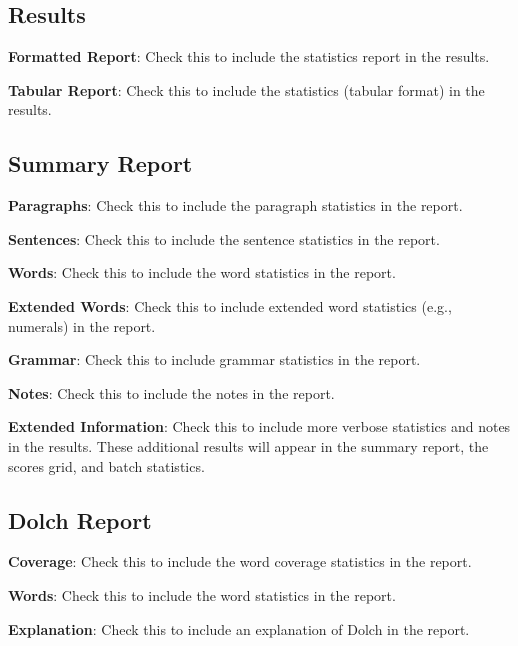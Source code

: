 \documentclass[
]{book}
\theoremstyle{definition}
\theoremstyle{definition}
\theoremstyle{definition}
\theoremstyle{definition}
\theoremstyle{remark}
\begin{document}
\hypertarget{results}{%
\subsection*{Results}\label{results}}

\textbf{Formatted Report}: Check this to include the statistics report in the results.

\textbf{Tabular Report}: Check this to include the statistics (tabular format) in the results.

\hypertarget{options-summary-report}{%
\subsection*{Summary Report}\label{options-summary-report}}

\textbf{Paragraphs}: Check this to include the paragraph statistics in the report.

\textbf{Sentences}: Check this to include the sentence statistics in the report.

\textbf{Words}: Check this to include the word statistics in the report.

\textbf{Extended Words}: Check this to include extended word statistics (e.g., numerals) in the report.

\textbf{Grammar}: Check this to include grammar statistics in the report.

\textbf{Notes}: Check this to include the notes in the report.

\textbf{Extended Information}: Check this to include more verbose statistics and notes in the results. These additional results will appear in the summary report, the scores grid, and batch statistics.

\hypertarget{options-dolch-report}{%
\subsection*{Dolch Report}\label{options-dolch-report}}

\textbf{Coverage}: Check this to include the word coverage statistics in the report.

\textbf{Words}: Check this to include the word statistics in the report.

\textbf{Explanation}: Check this to include an explanation of Dolch in the report.

\newpage
\end{document}
